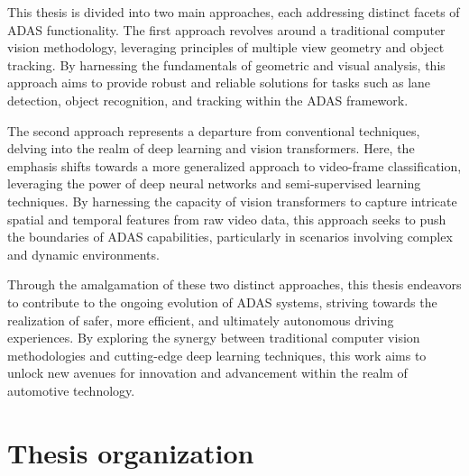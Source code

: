 This thesis is divided into two main approaches, each addressing distinct facets of ADAS functionality. The first approach revolves around a traditional computer vision methodology, leveraging principles of multiple view geometry and object tracking. By harnessing the fundamentals of geometric and visual analysis, this approach aims to provide robust and reliable solutions for tasks such as lane detection, object recognition, and tracking within the ADAS framework.

The second approach represents a departure from conventional techniques, delving into the realm of deep learning and vision transformers. Here, the emphasis shifts towards a more generalized approach to video-frame classification, leveraging the power of deep neural networks and semi-supervised learning techniques. By harnessing the capacity of vision transformers to capture intricate spatial and temporal features from raw video data, this approach seeks to push the boundaries of ADAS capabilities, particularly in scenarios involving complex and dynamic environments.

Through the amalgamation of these two distinct approaches, this thesis endeavors to contribute to the ongoing evolution of ADAS systems, striving towards the realization of safer, more efficient, and ultimately autonomous driving experiences. By exploring the synergy between traditional computer vision methodologies and cutting-edge deep learning techniques, this work aims to unlock new avenues for innovation and advancement within the realm of automotive technology.


\section{Thesis organization}